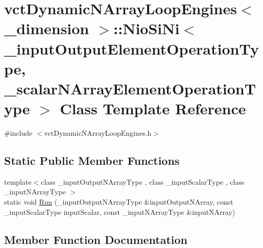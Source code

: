 \hypertarget{classvct_dynamic_n_array_loop_engines_1_1_nio_si_ni}{}\section{vct\+Dynamic\+N\+Array\+Loop\+Engines$<$ \+\_\+dimension $>$\+:\+:Nio\+Si\+Ni$<$ \+\_\+input\+Output\+Element\+Operation\+Type, \+\_\+scalar\+N\+Array\+Element\+Operation\+Type $>$ Class Template Reference}
\label{classvct_dynamic_n_array_loop_engines_1_1_nio_si_ni}


{\ttfamily \#include $<$vct\+Dynamic\+N\+Array\+Loop\+Engines.\+h$>$}

\subsection*{Static Public Member Functions}
\begin{DoxyCompactItemize}
\item 
{\footnotesize template$<$class \+\_\+input\+Output\+N\+Array\+Type , class \+\_\+input\+Scalar\+Type , class \+\_\+input\+N\+Array\+Type $>$ }\\static void \hyperlink{classvct_dynamic_n_array_loop_engines_1_1_nio_si_ni_a8cec2625fb690437be4a497ebdf2cfe0}{Run} (\+\_\+input\+Output\+N\+Array\+Type \&input\+Output\+N\+Array, const \+\_\+input\+Scalar\+Type input\+Scalar, const \+\_\+input\+N\+Array\+Type \&input\+N\+Array)
\end{DoxyCompactItemize}


\subsection{Member Function Documentation}
\hypertarget{classvct_dynamic_n_array_loop_engines_1_1_nio_si_ni_a8cec2625fb690437be4a497ebdf2cfe0}{}
